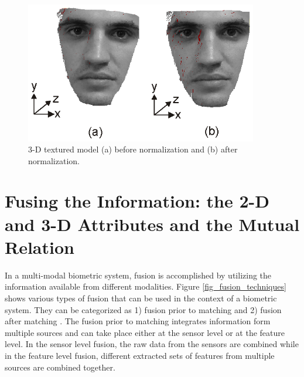 \begin{figure}[tbp]
\begin{center}
  \includegraphics[scale = .7, width = 4.0in]{./chapters/figures/normalized_3D_face.eps}
  \caption{3-D textured model (a) before normalization and (b) after normalization.}\label{fig_pose_normalization_sample}
\end{center}
\end{figure}


\section{Fusing the Information: the 2-D and 3-D Attributes and the Mutual Relation}
In a multi-modal biometric system, fusion is accomplished by
utilizing the information available from different modalities.
Figure \ref{fig_fusion_techniques} shows various types of fusion
that can be used in the context of a biometric system. They can be
categorized as 1) fusion prior to matching and 2) fusion after
matching \cite{Ross06}. The fusion prior to matching integrates
information form multiple sources and can take place either at the
sensor level or at the feature level. In the sensor level fusion,
the raw data from the sensors are combined while in the feature
level fusion, different extracted sets of features from multiple
sources are combined together.


